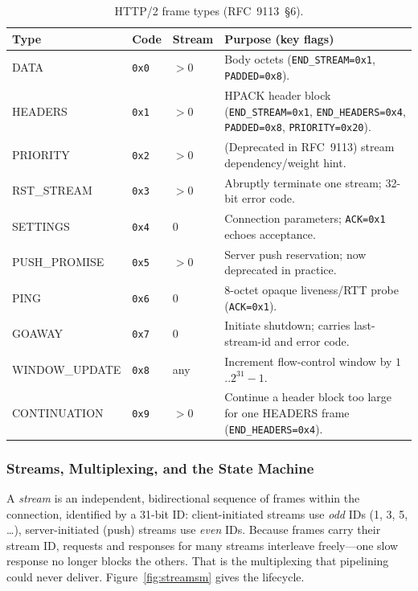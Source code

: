 \begin{table}[h]
  \centering
  \small
  \begin{tabularx}{\textwidth}{l l l X}
    \toprule
    \textbf{Type} & \textbf{Code} & \textbf{Stream} & \textbf{Purpose (key flags)} \\
    \midrule
    DATA          & \texttt{0x0} & $>$0 & Body octets (\texttt{END\_STREAM=0x1}, \texttt{PADDED=0x8}). \\
    HEADERS       & \texttt{0x1} & $>$0 & HPACK header block (\texttt{END\_STREAM=0x1}, \texttt{END\_HEADERS=0x4}, \texttt{PADDED=0x8}, \texttt{PRIORITY=0x20}). \\
    PRIORITY      & \texttt{0x2} & $>$0 & (Deprecated in RFC~9113) stream dependency/weight hint. \\
    RST\_STREAM   & \texttt{0x3} & $>$0 & Abruptly terminate one stream; 32-bit error code. \\
    SETTINGS      & \texttt{0x4} & 0 & Connection parameters; \texttt{ACK=0x1} echoes acceptance. \\
    PUSH\_PROMISE & \texttt{0x5} & $>$0 & Server push reservation; now deprecated in practice. \\
    PING          & \texttt{0x6} & 0 & 8-octet opaque liveness/RTT probe (\texttt{ACK=0x1}). \\
    GOAWAY        & \texttt{0x7} & 0 & Initiate shutdown; carries last-stream-id and error code. \\
    WINDOW\_UPDATE & \texttt{0x8} & any & Increment flow-control window by $1$..$2^{31}-1$. \\
    CONTINUATION  & \texttt{0x9} & $>$0 & Continue a header block too large for one HEADERS frame (\texttt{END\_HEADERS=0x4}). \\
    \bottomrule
  \end{tabularx}
  \caption{HTTP/2 frame types (RFC~9113~\S6).}
  \label{tab:h2frames}
\end{table}

\subsubsection{Streams, Multiplexing, and the State Machine}

A \emph{stream} is an independent, bidirectional sequence of frames within the connection, identified by a 31-bit ID: client-initiated streams use \emph{odd} IDs (1, 3, 5, \dots), server-initiated (push) streams use \emph{even} IDs. Because frames carry their stream ID, requests and responses for many streams interleave freely---one slow response no longer blocks the others. That is the multiplexing that pipelining could never deliver. Figure~\ref{fig:streamsm} gives the lifecycle.

